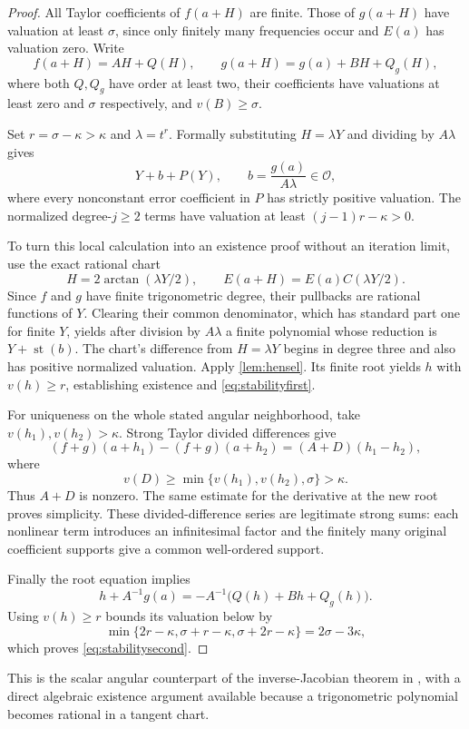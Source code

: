 \documentclass[11pt,letterpaper]{article}
\theoremstyle{definition}
\theoremstyle{remark}
\newcommand{\OO}{\mathcal O}\newcommand{\mm}{\mathfrak m}
\newcommand{\st}{\operatorname{st}}
\newcommand{\arct}{\operatorname{arctan}}
\numberwithin{equation}{section}
\begin{document}
\begin{proof}
All Taylor coefficients of $f(a+H)$ are finite. Those of $g(a+H)$ have valuation at least $\sigma$, since only finitely many frequencies occur and $E(a)$ has valuation zero. Write
\[
 f(a+H)=AH+Q(H),\qquad
 g(a+H)=g(a)+BH+Q_g(H),
\]
where both $Q,Q_g$ have order at least two, their coefficients have valuations at least zero and $\sigma$ respectively, and $v(B)\ge\sigma$.

Set $r=\sigma-\kappa>\kappa$ and $\lambda=t^r$. Formally substituting $H=\lambda Y$ and dividing by $A\lambda$ gives
\[
 Y+b+P(Y),\qquad b=\frac{g(a)}{A\lambda}\in\OO,
\]
where every nonconstant error coefficient in $P$ has strictly positive valuation. The normalized degree-$j\ge2$ terms have valuation at least $(j-1)r-\kappa>0$.

To turn this local calculation into an existence proof without an iteration limit, use the exact rational chart
\[
 H=2\arct(\lambda Y/2),\qquad E(a+H)=E(a)C(\lambda Y/2).
\]
Since $f$ and $g$ have finite trigonometric degree, their pullbacks are rational functions of $Y$. Clearing their common denominator, which has standard part one for finite $Y$, yields after division by $A\lambda$ a finite polynomial whose reduction is $Y+\st(b)$. The chart's difference from $H=\lambda Y$ begins in degree three and also has positive normalized valuation. Apply \cref{lem:hensel}. Its finite root yields $h$ with $v(h)\ge r$, establishing existence and \eqref{eq:stabilityfirst}.

For uniqueness on the whole stated angular neighborhood, take $v(h_1),v(h_2)>\kappa$. Strong Taylor divided differences give
\[
 (f+g)(a+h_1)-(f+g)(a+h_2)
 =(A+D)(h_1-h_2),
\]
where
\[
 v(D)\ge\min\{v(h_1),v(h_2),\sigma\}>\kappa.
\]
Thus $A+D$ is nonzero. The same estimate for the derivative at the new root proves simplicity. These divided-difference series are legitimate strong sums: each nonlinear term introduces an infinitesimal factor and the finitely many original coefficient supports give a common well-ordered support.

Finally the root equation implies
\[
 h+A^{-1}g(a)=-A^{-1}\bigl(Q(h)+Bh+Q_g(h)\bigr).
\]
Using $v(h)\ge r$ bounds its valuation below by
\[
 \min\{2r-\kappa,\sigma+r-\kappa,\sigma+2r-\kappa\}
 =2\sigma-3\kappa,
\]
which proves \eqref{eq:stabilitysecond}.
\end{proof}
This is the scalar angular counterpart of the inverse-Jacobian theorem in \cite[\S9]{SourceIntersections}, with a direct algebraic existence argument available because a trigonometric polynomial becomes rational in a tangent chart.
\end{document}
